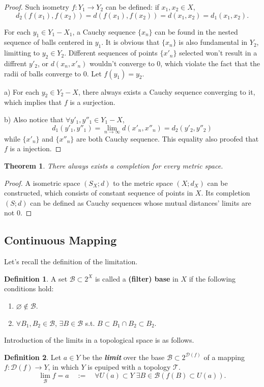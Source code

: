 \documentclass[openany]{book}
\newcommand*{\indexbf}[1]{\emph{\textbf{#1}}\index{#1}} %
\theoremstyle{plain}
\newtheorem{theorem}{Theorem}[section] %
\theoremstyle{definition}
\newtheorem{definition}{Definition}[section] %
\begin{document}
\begin{proof}
Such isometry $f:Y_1\to Y_2$ can be defined: if $x_1,x_2\in X$, 
\[
	d_2( f(x_1) , f(x_2) )=d(f(x_1), f(x_2)) = d(x_1 , x_2)=d_1(x_1, x_2).
\]

For each $y_1\in Y_1 - X_1$, a Cauchy sequence $\{x_n\}$ can be found in the nested sequence of balls centered in $y_1$. It is obvious that $\{x_n\}$ is also fundamental in $Y_2$, limitting to $y_2\in Y_2$. Different sequences of points $\{x'_n\}$ selected won't result in a diffrent $y'_2$, or $d(x_n,x'_n)$ wouldn't converge to $0$, which violate the fact that the radii of balls converge to $0$. Let $f(y_1)=y_2$. 

a) For each $y_2\in Y_2 - X$, there always exists a Cauchy sequence converging to it, which implies that $f$ is a surjection.

b) Also notice that $\forall y'_1,y''_1\in Y_1 - X$,
\[
	d_1(y'_1,y''_1)= \lim_{n\to\infty} d(x'_n,x''_n)=d_2(y'_2,y''_2)
\]
while $\{x'_n\}$ and $\{x''_n\}$ are both Cauchy sequence. This equality also proofed that $f$ is a injection.
\end{proof}
\begin{theorem}\label{completion_exists}
There always exists a completion for every metric space.
\end{theorem}
\begin{proof}
	A isometric space $(S_X;d)$ to the metric space $(X;d_X)$ can be constructed, which consists of constant sequence of points in $X$. Its completion $(S;d)$ can be defined as Cauchy sequences whose mutual distances' limits are not $0$.
\end{proof}
\subsection{Continuous Mapping}
Let's recall the definition of the limitation.
\begin{definition}\label{filter_base}
A set $\mathscr{B}\subset 2^X$ is called a \textbf{(filter) base} in $X$ if the following conditions hold:
\begin{enumerate}[label=\alph*)]
\item $\varnothing \notin \mathscr{B}$.
\item $\forall B_1,B_2\in \mathscr{B}$, $\exists B\in \mathscr{B}$ s.t. $B\subset B_1\cap B_2\subset B_2$. 
\end{enumerate}
\end{definition}
Introduction of the limits in a topological space is as follows.
\begin{definition}\label{limit}
Let $a\in Y$ be the \indexbf{limit} over the base $\mathscr{B}\subset 2^{\mathscr{D}(f)}$ of a mapping $f:\mathscr{D}( f )\to Y$, in which $Y$ is epuiped with a topology $\mathscr{T}$. 
\[
	\lim_\mathscr{B} f = a 
	\quad:=\quad
	\forall U(a)\subset Y\;
	\exists B\in \mathscr{B}(f(B)\subset U(a)).
\]
\end{definition}
\end{document}
